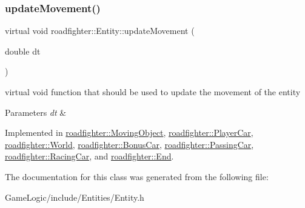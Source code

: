 \mbox{\label{classroadfighter_1_1Entity_a66614a11004d6f9516473f60b530f689}} 
\subsubsection{\texorpdfstring{update\+Movement()}{updateMovement()}}
{\footnotesize\ttfamily virtual void roadfighter\+::\+Entity\+::update\+Movement (\begin{DoxyParamCaption}\item[{double}]{dt }\end{DoxyParamCaption})\hspace{0.3cm}{\ttfamily [pure virtual]}}

virtual void function that should be used to update the movement of the entity 
\begin{DoxyParams}{Parameters}
{\em dt} & \\
\hline
\end{DoxyParams}


Implemented in \hyperlink{classroadfighter_1_1MovingObject_ac1918d96dac118c4bd7d99168d92867c}{roadfighter\+::\+Moving\+Object}, \hyperlink{classroadfighter_1_1PlayerCar_aa1dcbec01dde1b212e4919b61338edde}{roadfighter\+::\+Player\+Car}, \hyperlink{classroadfighter_1_1World_a880776b589376b1b4fd5ed4f26de4482}{roadfighter\+::\+World}, \hyperlink{classroadfighter_1_1BonusCar_a2d3d584ca34a5df3b3c833123a9bbc30}{roadfighter\+::\+Bonus\+Car}, \hyperlink{classroadfighter_1_1PassingCar_ade5ebca5d7dbdb75bd9eee5817972363}{roadfighter\+::\+Passing\+Car}, \hyperlink{classroadfighter_1_1RacingCar_a2e8f3c63381a1fe432cddcc1f34fb935}{roadfighter\+::\+Racing\+Car}, and \hyperlink{classroadfighter_1_1End_a6ea4afe8b07f96801fb2a67b82d6b71c}{roadfighter\+::\+End}.



The documentation for this class was generated from the following file\+:\begin{DoxyCompactItemize}
\item 
Game\+Logic/include/\+Entities/Entity.\+h\end{DoxyCompactItemize}
